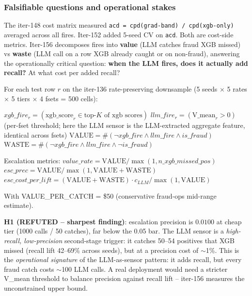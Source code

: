 
\subsubsection{Falsifiable questions and operational stakes}
The iter-148 cost matrix measured \texttt{acd = cpd(grad-band) /
cpd(xgb-only)} averaged across all fires. Iter-152 added 5-seed CV on
\texttt{acd}. Both are cost-side metrics. Iter-156 decomposes fires
into \textbf{value} (LLM catches fraud XGB missed) vs \textbf{waste}
(LLM call on a row XGB already caught or on non-fraud), answering the
operationally critical question: \textbf{when the LLM fires, does it
actually add recall?} At what cost per added recall?

For each test row $r$ on the iter-136 rate-preserving downsample (5
seeds $\times$ 5 rates $\times$ 5 tiers $\times$ 4 fsets = 500 cells):

  $xgb\_fire_r = (\text{xgb\_score}_r \in \text{top-}K\text{ of xgb scores})$
  $llm\_fire_r = (\text{V\_mean}_r > 0)$ (per-fset threshold; here
                 the LLM sensor is the LLM-extracted aggregate
                 feature, identical across fsets)
  $\text{VALUE} = \#(\neg xgb\_fire \wedge llm\_fire \wedge is\_fraud)$
  $\text{WASTE} = \#(\neg xgb\_fire \wedge llm\_fire \wedge \neg is\_fraud)$

Escalation metrics:
  $value\_rate = \text{VALUE} / \max(1, n\_xgb\_missed\_pos)$
  $esc\_prec = \text{VALUE} / \max(1, \text{VALUE} + \text{WASTE})$
  $esc\_cost\_per\_lift = (\text{VALUE} + \text{WASTE}) \cdot c_{LLM} / \max(1, \text{VALUE})$

With VALUE\_PER\_CATCH = \$50 (conservative fraud-ops mid-range estimate).

\textbf{H1 (REFUTED -- sharpest finding)}: escalation precision is
$0.0100$ at cheap tier (1000 calls / 50 catches), far below the 0.05
bar.  The LLM sensor is a \emph{high-recall, low-precision} second-stage
trigger: it catches 50--54 positives that XGB missed (recall lift
42--69\% across seeds), but at a precision cost of $\sim$1\%.  This is
the \emph{operational signature} of the LLM-as-sensor pattern: it adds
recall, but every fraud catch costs $\sim$100 LLM calls.  A real
deployment would need a stricter V\_mean threshold to balance
precision against recall lift -- iter-156 measures the unconstrained
upper bound.

